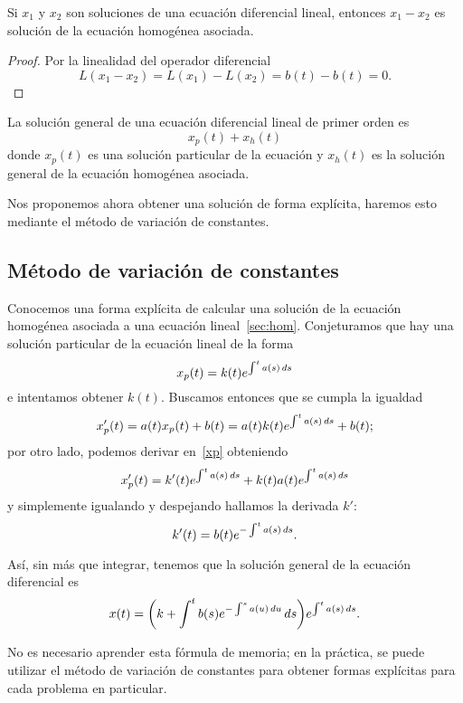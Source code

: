 \documentclass[../ecuaciones_diferenciales.tex]{subfiles}
\begin{document}
\begin{lemma}
	Si \(x_1\) y \(x_2\) son soluciones de una ecuación diferencial lineal,
	entonces \(x_1 - x_2\) es solución de la ecuación homogénea asociada.
\end{lemma}

\begin{proof}
	Por la linealidad del operador diferencial
	\[L(x_1 - x_2) = L(x_1) - L(x_2) = b(t) - b(t) = 0.\]
\end{proof}

\begin{corollary}
	La solución general de una ecuación diferencial lineal de primer orden es
	\[x_p(t) + x_h(t)\]
	donde \(x_p(t)\) es una solución particular de la ecuación y \(x_h(t)\) es
	la solución general de la ecuación homogénea asociada.
\end{corollary}

Nos proponemos ahora obtener una solución de forma explícita, haremos esto
mediante el método de variación de constantes.

\subsection{Método de variación de constantes}

Conocemos una forma explícita de calcular una solución de la ecuación homogénea
asociada a una ecuación lineal~\autoref{sec:hom}. Conjeturamos que hay una
solución particular de la ecuación lineal de la forma
\begin{equation}\label{xp}
	x_p(t) = k(t) e^{\int^t a(s) \mathop{d\!} s}
\end{equation}
e intentamos obtener \(k(t)\). Buscamos entonces que se cumpla la igualdad
\[x'_p(t) = a(t)x_p(t) + b(t) = a(t)k(t) e^{\int^t a(s) \mathop{d\!} s} + b(t);\]
por otro lado, podemos derivar en~\eqref{xp} obteniendo
\[x'_p(t) = k'(t) e^{\int^t a(s) \mathop{d\!} s} + k(t)a(t) e^{\int^t a(s) \mathop{d\!} s}\]
y simplemente igualando y despejando hallamos la derivada \(k'\):
\[k'(t) = b(t)e^{-\int^t a(s) \mathop{d\!} s}.\]

Así, sin más que integrar, tenemos que la solución general de la ecuación
diferencial es
\[x(t) = \parens{k + \int^t b(s) e^{-\int^s a(u) \dif u} \dif s}
	e^{\int^t a(s) \dif s}.\]

\begin{remark}
	No es necesario aprender esta fórmula de memoria; en la práctica, se puede
    utilizar el método de variación de constantes para obtener formas explícitas
    para cada problema en particular.
\end{remark}
\end{document}
